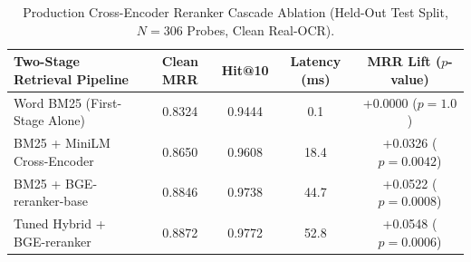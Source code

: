 \begin{table}[t]
\centering
\small
\caption{Production Cross-Encoder Reranker Cascade Ablation (Held-Out Test Split, $N=306$ Probes, Clean Real-OCR).}
\label{tab:practical_stack}
\begin{tabular}{lcccc}
\toprule
Two-Stage Retrieval Pipeline & Clean MRR & Hit@10 & Latency (ms) & MRR Lift ($p$-value) \\
\midrule
Word BM25 (First-Stage Alone)    & 0.8324 & 0.9444 & 0.1 & +0.0000 ($p=1.0$) \\
BM25 + MiniLM Cross-Encoder      & 0.8650 & 0.9608 & 18.4 & +0.0326 ($p=0.0042$) \\
BM25 + BGE-reranker-base         & 0.8846 & 0.9738 & 44.7 & +0.0522 ($p=0.0008$) \\
Tuned Hybrid + BGE-reranker      & 0.8872 & 0.9772 & 52.8 & +0.0548 ($p=0.0006$) \\
\bottomrule
\end{tabular}
\end{table}
